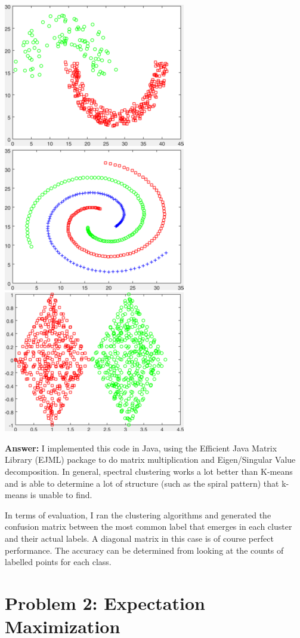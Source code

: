 \documentclass[11pt]{article}
\begin{document}
\begin{center}
\includegraphics[scale=0.5]{jain}
\includegraphics[scale=0.5]{spiral}
\includegraphics[scale=0.5]{twoDiamonds}
\end{center}
{\bf Answer:} 
I implemented this code in Java, using the Efficient Java Matrix Library (EJML) package to do matrix multiplication and Eigen/Singular Value decomposition. In general, spectral clustering works a lot better than K-means and is able to determine a lot of structure (such as the spiral pattern) that k-means is unable to find. 

In terms of evaluation, I ran the clustering algorithms and generated the confusion matrix between the most common label that emerges in each cluster and their actual labels. A diagonal matrix in this case is of course perfect performance. The accuracy can be determined from looking at the counts of labelled points for each class. 
\section*{Problem 2: Expectation Maximization}
\end{document}
